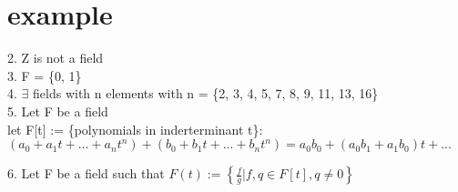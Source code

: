 \documentclass[11pt]{article}
\begin{document}
\section{example}
2. Z is not a field\\

3. F = \{0, 1\}\\

4. $\exists$ fields with n elements with n = \{2, 3, 4, 5, 7, 8, 9, 11, 13, 16\}\\

5. Let F be a field \\
let F[t] := \{polynomials in inderterminant t\}:\\
$(a_0+a_1t+...+a_nt^n)+(b_0+b_1t+...+b_nt^n) = a_0b_0+(a_0b_1+a_1b_0)t+...$

6. Let F be a field such that $F(t) := \left\{\frac{f}{g}| f,q\in F[t], q\neq 0\right\}$
\end{document}
